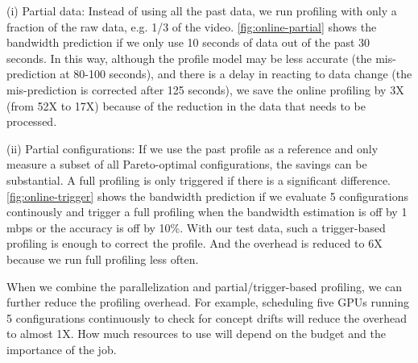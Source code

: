 (i) Partial data: Instead of using all the past data, we run profiling with only
a fraction of the raw data, e.g. 1/3 of the video.  \autoref{fig:online-partial}
shows the bandwidth prediction if we only use 10 seconds of data out of the past
30 seconds. In this way, although the profile model may be less accurate (the
mis-prediction at 80-100 seconds), and there is a delay in reacting to data
change (the mis-prediction is corrected after 125 seconds), we save the online
profiling by 3X (from 52X to 17X) because of the reduction in the data that
needs to be processed.

(ii) Partial configurations: If we use the past profile as a reference and only
measure a subset of all Pareto-optimal configurations, the savings can be
substantial. A full profiling is only triggered if there is a significant
difference. \autoref{fig:online-trigger} shows the bandwidth prediction if we
evaluate 5 configurations continously and trigger a full profiling when the
bandwidth estimation is off by 1 mbps or the accuracy is off by 10\%. With our
test data, such a trigger-based profiling is enough to correct the profile.  And
the overhead is reduced to 6X because we run full profiling less often.

When we combine the parallelization and partial/trigger-based profiling, we can
further reduce the profiling overhead. For example, scheduling five GPUs running
5 configurations continuously to check for concept drifts will reduce the
overhead to almost 1X. How much resources to use will depend on the budget and
the importance of the job.

